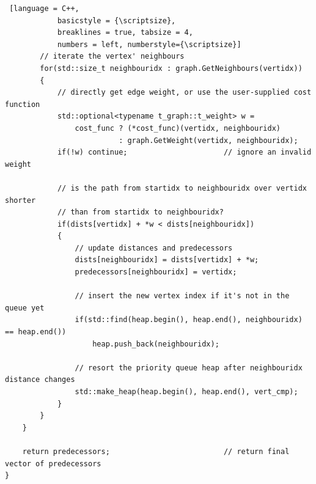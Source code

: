 \begin{listing}[htb]
\begin{lstlisting} [language = C++,
			basicstyle = {\scriptsize},
			breaklines = true, tabsize = 4,
			numbers = left, numberstyle={\scriptsize}]
		// iterate the vertex' neighbours
		for(std::size_t neighbouridx : graph.GetNeighbours(vertidx))
		{
			// directly get edge weight, or use the user-supplied cost function
			std::optional<typename t_graph::t_weight> w = 
				cost_func ? (*cost_func)(vertidx, neighbouridx)
				          : graph.GetWeight(vertidx, neighbouridx);
			if(!w) continue;                      // ignore an invalid weight

			// is the path from startidx to neighbouridx over vertidx shorter
			// than from startidx to neighbouridx?
			if(dists[vertidx] + *w < dists[neighbouridx])
			{
				// update distances and predecessors
				dists[neighbouridx] = dists[vertidx] + *w;
				predecessors[neighbouridx] = vertidx;

				// insert the new vertex index if it's not in the queue yet
				if(std::find(heap.begin(), heap.end(), neighbouridx) == heap.end())
					heap.push_back(neighbouridx);

				// resort the priority queue heap after neighbouridx distance changes
				std::make_heap(heap.begin(), heap.end(), vert_cmp);
			}
		}
	}

	return predecessors;                          // return final vector of predecessors
}
	\end{lstlisting}
	\caption[C++ implementation of Dijkstra's algorithm.]{
	C++20 implementation of Dijkstra's algorithm, based on pseudo-codes from 
	Refs. \cite[p. 17]{FUH_algo_graphs_2021} and \cite[p. 285]{Erickson2019}.
	\label{lst:dijkstra}}
\end{listing}


